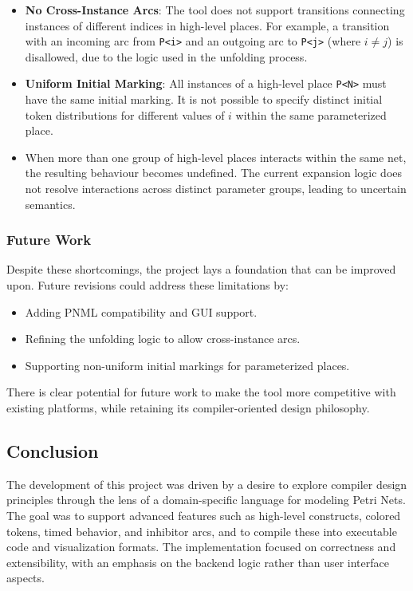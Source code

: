 \documentclass[12pt]{article}
\begin{document}
        \begin{itemize}
            \item \textbf{No Cross-Instance Arcs}: The tool does not support transitions connecting instances of different indices in high-level places. For example, a transition with an incoming arc from \texttt{P<i>} and an outgoing arc to \texttt{P<j>} (where $i \ne j$) is disallowed, due to the logic used in the unfolding process.
            \item \textbf{Uniform Initial Marking}: All instances of a high-level place \texttt{P<N>} must have the same initial marking. It is not possible to specify distinct initial token distributions for different values of $i$ within the same parameterized place.
            \item When more than one group of high-level places interacts within the same net, the resulting behaviour becomes undefined. The current expansion logic does not resolve interactions across distinct parameter groups, leading to uncertain semantics.
        \end{itemize}

    \subsubsection{Future Work}

    Despite these shortcomings, the project lays a foundation that can be improved upon. Future revisions could address these limitations by:
    \begin{itemize}
        \item Adding PNML compatibility and GUI support.
        \item Refining the unfolding logic to allow cross-instance arcs.
        \item Supporting non-uniform initial markings for parameterized places.
    \end{itemize}

    There is clear potential for future work to make the tool more competitive with existing platforms, while retaining its compiler-oriented design philosophy.

\subsection{Conclusion}
The development of this project was driven by a desire to explore compiler design principles through the lens of a domain-specific language for modeling Petri Nets. The goal was to support advanced features such as high-level constructs, colored tokens, timed behavior, and inhibitor arcs, and to compile these into executable code and visualization formats. The implementation focused on correctness and extensibility, with an emphasis on the backend logic rather than user interface aspects.
\end{document}
